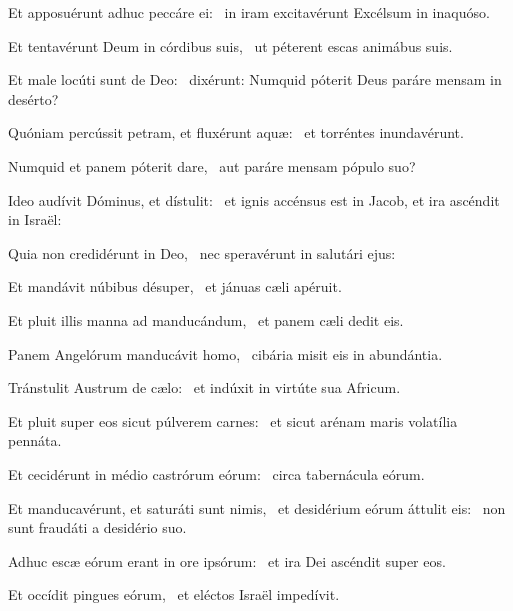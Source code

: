 
\item Et apposuérunt adhuc peccáre ei:~\psstar{} in iram excitavérunt Excélsum in inaquóso.

\item Et tentavérunt Deum in córdibus suis,~\psstar{} ut péterent escas animábus suis.

\item Et male locúti sunt de Deo:~\psstar{} dixérunt: Numquid póterit Deus paráre mensam in desérto?

\item Quóniam percússit petram, et fluxérunt aquæ:~\psstar{} et torréntes inundavérunt.

\item Numquid et panem póterit dare,~\psstar{} aut paráre mensam pópulo suo?

\item Ideo audívit Dóminus, et dístulit:~\psstar{} et ignis accénsus est in Jacob, et ira ascéndit in Israël:

\item Quia non credidérunt in Deo,~\psstar{} nec speravérunt in salutári ejus:

\item Et mandávit núbibus désuper,~\psstar{} et jánuas cæli apéruit.

\item Et pluit illis manna ad manducándum,~\psstar{} et panem cæli dedit eis.

\item Panem Angelórum manducávit homo,~\psstar{} cibária misit eis in abundántia.

\item Tránstulit Austrum de cælo:~\psstar{} et indúxit in virtúte sua Africum.

\item Et pluit super eos sicut púlverem carnes:~\psstar{} et sicut arénam maris volatília pennáta.

\item Et cecidérunt in médio castrórum eórum:~\psstar{} circa tabernácula eórum.

\item Et manducavérunt, et saturáti sunt nimis,~\pscross{} et desidérium eórum áttulit eis:~\psstar{} non sunt fraudáti a desidério suo.

\item Adhuc escæ eórum erant in ore ipsórum:~\psstar{} et ira Dei ascéndit super eos.

\item Et occídit pingues eórum,~\psstar{} et eléctos Israël impedívit.
